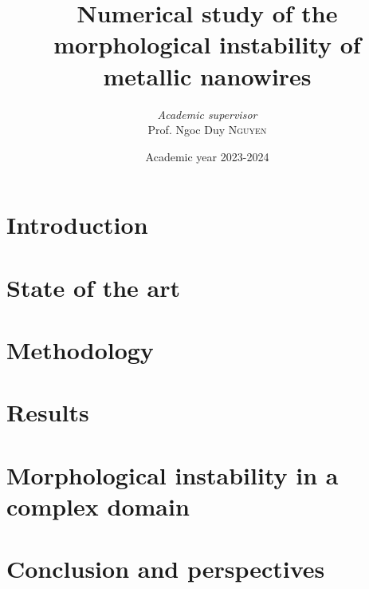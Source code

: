 \documentclass[twoside, 12pt]{report}
\institute{University of Liège}
\title{Numerical study of the morphological instability of metallic nanowires}
\author{\textit{Academic supervisor}\\Prof. Ngoc Duy \textsc{Nguyen}}
\date{Academic year 2023-2024}
\begin{document}
    \maketitle
    \chapter*{Introduction}\label{chap:intro}
    
    \chapter{State of the art}
    
    \chapter{Methodology}
    
    \chapter{Results}
    
    \chapter{Morphological instability in a complex domain}
    
    \chapter*{Conclusion and perspectives}\label{chap:concl}
    

    
    \newpage
    \appendix
    
    
    \newpage

\end{document}

